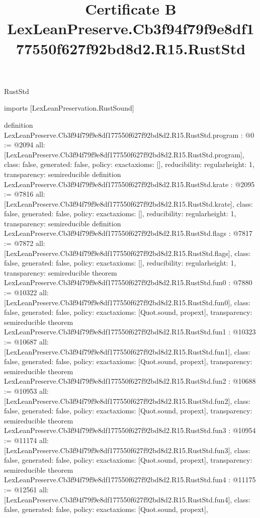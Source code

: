 \begin{lexlean}{RustStd}
\title{Certificate B LexLeanPreserve.Cb3f94f79f9e8df177550f627f92bd8d2.R15.RustStd}
\begin{coremodule}
imports [LexLeanPreservation.RustSound]

definition LexLeanPreserve.Cb3f94f79f9e8df177550f627f92bd8d2.R15.RustStd.program : @0 := @2094 {
  all: [LexLeanPreserve.Cb3f94f79f9e8df177550f627f92bd8d2.R15.RustStd.program],
  class: false,
  generated: false,
  policy: exact{axioms: []},
  reducibility: regular{height: 1},
  transparency: semireducible
}
definition LexLeanPreserve.Cb3f94f79f9e8df177550f627f92bd8d2.R15.RustStd.krate : @2095 := @7816 {
  all: [LexLeanPreserve.Cb3f94f79f9e8df177550f627f92bd8d2.R15.RustStd.krate],
  class: false,
  generated: false,
  policy: exact{axioms: []},
  reducibility: regular{height: 1},
  transparency: semireducible
}
definition LexLeanPreserve.Cb3f94f79f9e8df177550f627f92bd8d2.R15.RustStd.flags : @7817 := @7872 {
  all: [LexLeanPreserve.Cb3f94f79f9e8df177550f627f92bd8d2.R15.RustStd.flags],
  class: false,
  generated: false,
  policy: exact{axioms: []},
  reducibility: regular{height: 1},
  transparency: semireducible
}
theorem LexLeanPreserve.Cb3f94f79f9e8df177550f627f92bd8d2.R15.RustStd.fun0 : @7880 := @10322 {
  all: [LexLeanPreserve.Cb3f94f79f9e8df177550f627f92bd8d2.R15.RustStd.fun0],
  class: false,
  generated: false,
  policy: exact{axioms: [Quot.sound, propext]},
  transparency: semireducible
}
theorem LexLeanPreserve.Cb3f94f79f9e8df177550f627f92bd8d2.R15.RustStd.fun1 : @10323 := @10687 {
  all: [LexLeanPreserve.Cb3f94f79f9e8df177550f627f92bd8d2.R15.RustStd.fun1],
  class: false,
  generated: false,
  policy: exact{axioms: [Quot.sound, propext]},
  transparency: semireducible
}
theorem LexLeanPreserve.Cb3f94f79f9e8df177550f627f92bd8d2.R15.RustStd.fun2 : @10688 := @10953 {
  all: [LexLeanPreserve.Cb3f94f79f9e8df177550f627f92bd8d2.R15.RustStd.fun2],
  class: false,
  generated: false,
  policy: exact{axioms: [Quot.sound, propext]},
  transparency: semireducible
}
theorem LexLeanPreserve.Cb3f94f79f9e8df177550f627f92bd8d2.R15.RustStd.fun3 : @10954 := @11174 {
  all: [LexLeanPreserve.Cb3f94f79f9e8df177550f627f92bd8d2.R15.RustStd.fun3],
  class: false,
  generated: false,
  policy: exact{axioms: [Quot.sound, propext]},
  transparency: semireducible
}
theorem LexLeanPreserve.Cb3f94f79f9e8df177550f627f92bd8d2.R15.RustStd.fun4 : @11175 := @12561 {
  all: [LexLeanPreserve.Cb3f94f79f9e8df177550f627f92bd8d2.R15.RustStd.fun4],
  class: false,
  generated: false,
  policy: exact{axioms: [Quot.sound, propext]},
}
\end{coremodule}
\end{lexlean}
